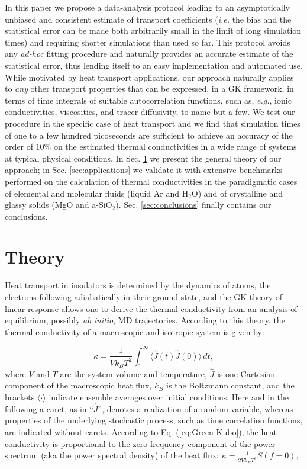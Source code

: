 In this paper we propose a data-analysis protocol leading to an asymptotically unbiased and consistent estimate of transport coefficients (\emph{i.e.} the bias and the statistical error can be made both arbitrarily small in the limit of long simulation times) and requiring shorter simulations than used so far. This protocol avoids any \emph{ad-hoc} fitting procedure and naturally provides an accurate estimate of the statistical error, thus lending itself to an easy implementation and automated use. While motivated by heat transport applications, our approach naturally applies to \emph{any} other transport properties that can be expressed, in a GK framework, in terms of time integrals of suitable autocorrelation functions, such as, \emph{e.g.}, ionic conductivities, viscosities, and tracer diffusivity, to name but a few. We test our procedure in the specific case of heat transport and we find that simulation times of one to a few hundred picoseconds are sufficient to achieve an accuracy of the order of $10\%$ on the estimated thermal conductivities in a wide range of systems at typical physical conditions. In Sec. \ref{sec:theory} we present the general theory of our approach; in Sec. \ref{sec:applications} we validate it with extensive benchmarks performed on the calculation of thermal conductivities in the paradigmatic cases of elemental and molecular fluids (liquid Ar and H$_2$O) and of crystalline and glassy solids (MgO and a-SiO$_2$). Sec. \ref{sec:conclusions} finally contains our conclusions.

\section{Theory}
\label{sec:theory}
Heat transport in insulators is determined by the dynamics of atoms, the electrons following adiabatically in their ground state, and the GK theory of linear response \cite{Green1954,Kubo1957} allows one to derive the thermal conductivity from an analysis of equilibrium, possibly \emph{ab initio}, MD trajectories. According to this theory, the thermal conductivity of a macroscopic and isotropic system is given by:

\begin{equation}
\kappa=\frac{1}{Vk_{B}T^{2}}\int_{0}^{\infty}\!\langle\hat{J}(t)\hat{J}(0)\rangle\, dt,\label{eq:Green-Kubo}
\end{equation}
where $V$ and $T$ are the system volume and temperature, $\hat{J}$ is one Cartesian component of the macroscopic heat flux,\cite{Hansen2013,Ercole2016} $k_{B}$ is the Boltzmann constant, and the brackets $\langle\cdot\rangle$ indicate ensemble averages over initial conditions. Here and in the following a caret, as in ``$\hat{J}$'', denotes a realization of a random variable, whereas properties of the underlying stochastic process, such as time correlation functions, are indicated without carets. According to Eq. (\ref{eq:Green-Kubo}), the heat conductivity is proportional to the zero-frequency component of the power spectrum (aka the power spectral density) of the heat flux: $\kappa=\frac{1}{2Vk_{B}T^{2}}S(f=0)$,

